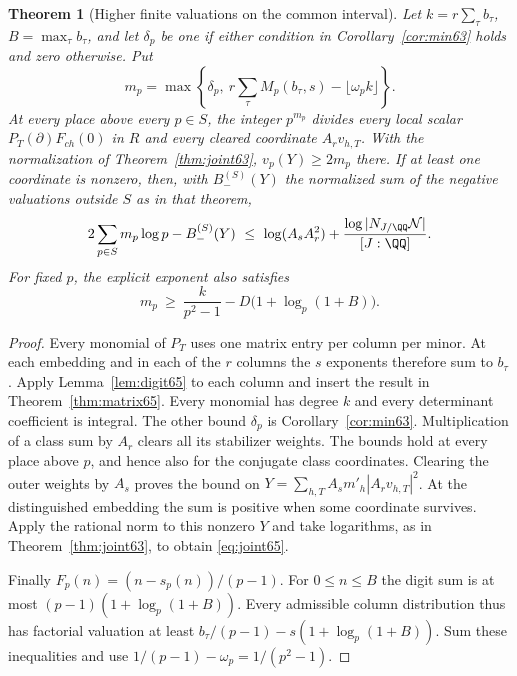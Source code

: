 \documentclass[a4paper,11pt]{article}
\newtheorem{theorem}[proposition]{Theorem}
\theoremstyle{definition}
\theoremstyle{remark}
\numberwithin{equation}{section}
\begin{document}
\begin{theorem}[Higher finite valuations on the common interval]\label{thm:joint65}
Let \(k=r\sum_\tau b_\tau\), \(B=\max_\tau b_\tau\), and let
\(\delta_p\) be one if either condition in
Corollary~\ref{cor:min63} holds and zero otherwise. Put
\begin{equation}
 m_p=\max\left\{\delta_p,\ r\sum_\tau M_p(b_\tau,s)
                                -\lfloor\omega_p k\rfloor\right\}.
                                                     \label{eq:mixed65}
\end{equation}
At every place above every \(p\in S\), the integer \(p^{m_p}\)
divides every local scalar \(P_T(\partial)F_{ch}(0)\) in \(R\)
and every cleared coordinate \(A_r v_{h,T}\). With the normalization
of Theorem~\ref{thm:joint63}, \(v_p(Y)\ge 2m_p\) there.
If at least one coordinate is nonzero, then, with
\(B_-^{(S)}(Y)\) the normalized sum of the negative valuations
outside \(S\) as in that theorem,
\begin{equation}
 2\sum_{p\in S}m_p\log p-B_-^{(S)}(Y)
    \ \le\ \log(A_s A_r^2)+
                     \frac{\log|N_{J/\QQ}\mathcal N|}{[J:\QQ]} .
                                                       \label{eq:joint65}
\end{equation}
For fixed \(p\), the explicit exponent also satisfies
\[
       m_p\ \ge\ \frac{k}{p^2-1}
                        -D\big(1+\log_p(1+B)\big).
\]
\end{theorem}
\begin{proof}
Every monomial of \(P_T\) uses one matrix entry per column per
minor. At each embedding and in each of the \(r\) columns the
\(s\) exponents therefore sum to \(b_\tau\). Apply
Lemma~\ref{lem:digit65} to each column and insert the result in
Theorem~\ref{thm:matrix65}. Every monomial has degree \(k\) and
every determinant coefficient is integral. The other bound
\(\delta_p\) is Corollary~\ref{cor:min63}. Multiplication of a
class sum by \(A_r\) clears all its stabilizer weights.
The bounds hold at every place above \(p\), and hence also for
the conjugate class coordinates. Clearing the outer weights by
\(A_s\) proves the bound on
\(Y=\sum_{h,T} A_s m'_h |A_r v_{h,T}|^2\). At the distinguished
embedding the sum is positive when some coordinate survives.
Apply the rational norm to this nonzero \(Y\) and take logarithms,
as in Theorem~\ref{thm:joint63}, to obtain \eqref{eq:joint65}.

Finally \(F_p(n)=(n-s_p(n))/(p-1)\). For \(0\le n\le B\) the
digit sum is at most \((p-1)(1+\log_p(1+B))\). Every admissible
column distribution thus has factorial valuation at least
\(b_\tau/(p-1)-s(1+\log_p(1+B))\).
Sum these inequalities and use
\(1/(p-1)-\omega_p=1/(p^2-1)\).
\end{proof}
\end{document}
